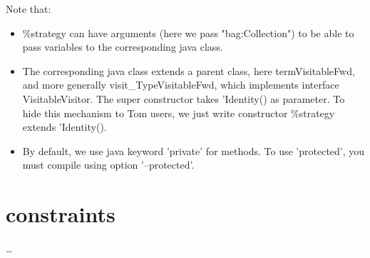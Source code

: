 \documentclass{article}
\begin{document}
Note that:
\begin{itemize}
\item{\%strategy can have arguments (here we pass "bag:Collection") to be able to pass variables to the corresponding java class.}
\item{The corresponding java class extends a parent class, here termVisitableFwd, and more generally visit\_TypeVisitableFwd, which implements interface VisitableVisitor. The super constructor takes 'Identity() as parameter. To hide this mechanism to Tom users, we just write constructor \%strategy extends 'Identity().}
\item{By default, we use java keyword 'private' for methods. To use 'protected', you must compile using option '--protected'.}
\end{itemize}

\section{constraints}
\dots
\end{document}

